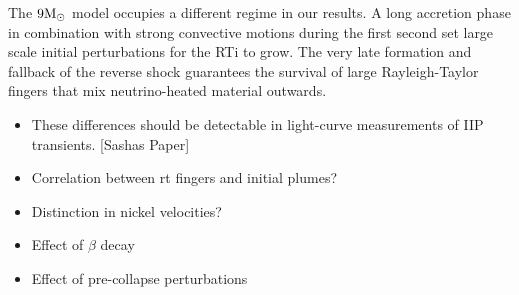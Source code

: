\documentclass[fleqn,usenatbib]{mnras}
\newcommand{\solm}{\xspace\ensuremath{\rm{M_{\odot}}}}
\newcommand{\COM}[1]{{\color{red}#1}}
\begin{document}
The $9\solm$ model occupies a different regime in our results. A long accretion phase in combination with strong convective motions during the first second set large scale initial perturbations for the RTi to grow. The very late formation and fallback of the reverse shock guarantees the survival of large Rayleigh-Taylor fingers that mix neutrino-heated material outwards. 


\begin{itemize}
    \item \COM{These differences should be detectable in light-curve measurements of IIP transients. [Sashas Paper]}
    \item \COM{Correlation between rt fingers and initial plumes?}
    \item \COM{Distinction in nickel velocities?}
    \item \COM{Effect of $\beta$ decay}
    \item \COM{Effect of pre-collapse perturbations}
\end{itemize}
\end{document}
